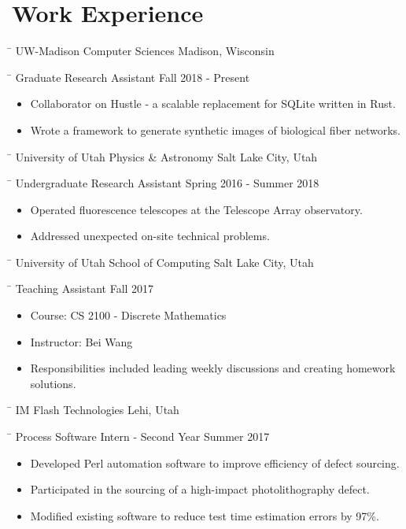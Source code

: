 \documentclass[12pt]{article}
\newcommand{\tabsize}{\hspace{4.8in}}
\newenvironment{tab1}
    {\bfseries \begin{tabbing} \tabsize \= \kill}
    {\end{tabbing}}
\newenvironment{tab2}
    {\begin{tabbing} \tabsize \= \kill}
    {\end{tabbing}}
\begin{document}
\section*{Work Experience}

\begin{tab1} UW-Madison Computer Sciences \> Madison, Wisconsin \end{tab1}
\begin{tab2} Graduate Research Assistant \> Fall 2018 - Present \end{tab2}
\begin{itemize}
    \item Collaborator on Hustle - a scalable replacement for SQLite written in Rust.
    \item Wrote a framework to generate synthetic images of biological fiber networks.
\end{itemize}

\bigskip

\begin{tab1} University of Utah Physics \& Astronomy \> Salt Lake City, Utah \end{tab1}
\begin{tab2} Undergraduate Research Assistant \> Spring 2016 - Summer 2018 \end{tab2}
\begin{itemize}
    \item Operated fluorescence telescopes at the Telescope Array observatory.
    \item Addressed unexpected on-site technical problems.
\end{itemize}

\bigskip

\begin{tab1} University of Utah School of Computing \> Salt Lake City, Utah \end{tab1}
\begin{tab2} Teaching Assistant \> Fall 2017 \end{tab2}
\begin{itemize}
    \item Course: CS 2100 - Discrete Mathematics
    \item Instructor: Bei Wang
    \item Responsibilities included leading weekly discussions and creating homework solutions.
\end{itemize}

\bigskip

\begin{tab1} IM Flash Technologies \> Lehi, Utah \end{tab1}
\begin{tab2} Process Software Intern - Second Year \> Summer 2017 \end{tab2}
\begin{itemize}
    \item Developed Perl automation software to improve efficiency of defect sourcing.
    \item Participated in the sourcing of a high-impact photolithography defect.
    \item Modified existing software to reduce test time estimation errors by 97\%.
\end{itemize}
\end{document}
